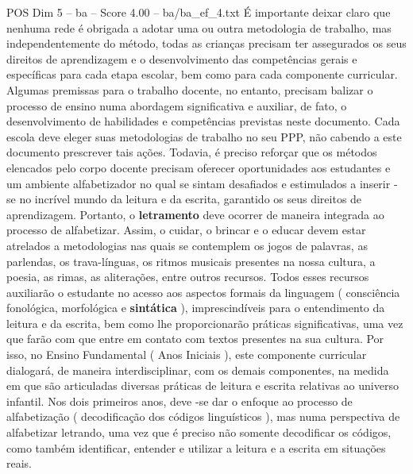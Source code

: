 \begin{textsample}{POS Dim 5 – ba – Score 4.00 – ba/ba\_ef\_4.txt}
É importante deixar claro que nenhuma rede é obrigada a adotar uma ou outra metodologia de trabalho, mas independentemente do método, todas as crianças precisam ter assegurados os seus direitos de aprendizagem e o desenvolvimento das competências gerais e específicas para cada etapa escolar, bem como para cada componente curricular.
Algumas premissas para o trabalho docente, no entanto, precisam balizar o processo de ensino numa abordagem significativa e auxiliar, de fato, o desenvolvimento de habilidades e competências previstas neste documento.
Cada escola deve eleger suas metodologias de trabalho no seu PPP, não cabendo a este documento prescrever tais ações.
Todavia, é preciso reforçar que os métodos elencados pelo corpo docente precisam oferecer oportunidades aos estudantes e um ambiente alfabetizador no qual se sintam desafiados e estimulados a inserir -se no incrível mundo da leitura e da escrita, garantido os seus direitos de aprendizagem.
Portanto, o \textbf{letramento} deve ocorrer de maneira integrada ao processo de alfabetizar.
Assim, o cuidar, o brincar e o educar devem estar atrelados a metodologias nas quais se contemplem os jogos de palavras, as parlendas, os trava-línguas, os ritmos musicais presentes na nossa cultura, a poesia, as rimas, as aliterações, entre outros recursos.
Todos esses recursos auxiliarão o estudante no acesso aos aspectos formais da linguagem ( consciência fonológica, morfológica e \textbf{sintática} ), imprescindíveis para o entendimento da leitura e da escrita, bem como lhe proporcionarão práticas significativas, uma vez que farão com que entre em contato com textos presentes na sua cultura.
Por isso, no Ensino Fundamental ( Anos Iniciais ), este componente curricular dialogará, de maneira interdisciplinar, com os demais componentes, na medida em que são articuladas diversas práticas de leitura e escrita relativas ao universo infantil.
Nos dois primeiros anos, deve -se dar o enfoque ao processo de alfabetização ( decodificação dos códigos linguísticos ), mas numa perspectiva de alfabetizar letrando, uma vez que é preciso não somente decodificar os códigos, como também identificar, entender e utilizar a leitura e a escrita em situações reais.

\end{textsample}
